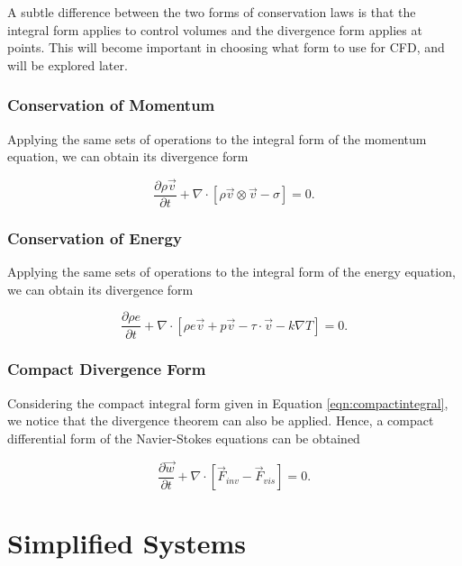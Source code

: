 \begin{remark}
A subtle difference between the two forms of conservation laws is that the integral form applies to control volumes and the divergence form applies at points. This will become important in choosing what form to use for CFD, and will be explored later.
\end{remark}

\subsection{Conservation of Momentum}
Applying the same sets of operations to the integral form of the momentum equation, we can obtain its divergence form
\begin{eqBox}
\begin{equation}
	 \frac{\partial \rho \vec{v}}{\partial t} + \nabla \cdot \left[ \rho \vec{v} \otimes \vec{v} - \sigma \right] =  0.
\end{equation}
\end{eqBox}

\subsection{Conservation of Energy}
Applying the same sets of operations to the integral form of the energy equation, we can obtain its divergence form
\begin{eqBox}
\begin{equation}
\frac{\partial \rho e}{\partial t} + \nabla \cdot \left[ \rho e \vec{v} + p\vec{v} - \tau \cdot \vec{v} - k \nabla T \right] = 0.
\end{equation}
\end{eqBox}

\subsection{Compact Divergence Form}
Considering the compact integral form given in Equation \ref{eqn:compactintegral}, we notice that the divergence theorem can also be applied. Hence, a compact differential form of the Navier-Stokes equations can be obtained
\begin{eqBox}
\begin{equation}
\frac{\partial \vec{w}}{\partial t} + \nabla \cdot \left[\vec{F}_{inv} - \vec{F}_{vis}\right] = 0.
\end{equation}
\end{eqBox}

\chapter{Simplified Systems}

